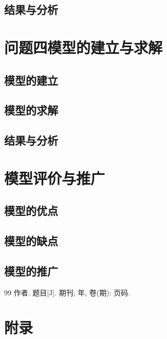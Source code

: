 \documentclass[withoutpreface,bwprint]{cumcmthesis} %
\begin{document}
\subsection{结果与分析}

\section{问题四模型的建立与求解}
\subsection{模型的建立}
\subsection{模型的求解}
\subsection{结果与分析}

\section{模型评价与推广}
\subsection{模型的优点}
\subsection{模型的缺点}
\subsection{模型的推广}

\begin{thebibliography}{99}
 作者. 题目[J]. 期刊, 年, 卷(期): 页码.
\end{thebibliography}

\newpage
\appendix
\section{附录}
\end{document}
